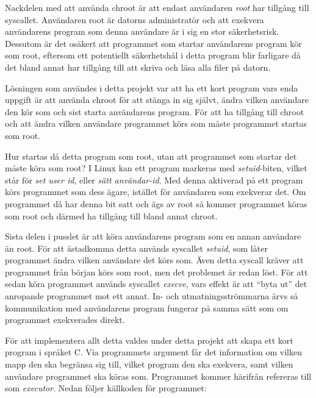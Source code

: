 \documentclass{article}
\begin{document}
Nackdelen med att använda chroot är att endast användaren \textit{root} har
tillgång till syscallet. Användaren root är datorns administratör och att
exekvera an\-vändarens program som denna användare är i sig en stor
säkerhetsrisk.  Dessutom är det osäkert att programmet som startar användarens
program kör som root, eftersom ett potentiellt säkerhetshål i detta program blir
farligare då det bland annat har tillgång till att skriva och läsa alla filer på
datorn.

Lösningen som användes i detta projekt var att ha ett kort program vars enda
uppgift är att använda chroot för att stänga in sig självt, ändra vilken
användare den kör som och sist starta användarens program. För att ha tillgång
till chroot och att ändra vilken användare programmet körs som måste programmet
startas som root.

Hur startas då detta program som root, utan att programmet som startar det måste
köra som root? I Linux kan ett program markeras med \textit{setuid}-biten,
vilket står för \textit{set user id}, eller \textit{sätt användar-id}. Med
denna aktiverad på ett program körs programmet som dess ägare, istället för
användaren som exekverar det. Om programmet då har denna bit satt och ägs av
root så kommer programmet köras som root och därmed ha tillgång till bland annat
chroot.

Sista delen i pusslet är att köra användarens program som en annan användare än
root. För att åstadkomma detta används syscallet \textit{setuid}, som låter
programmet ändra vilken användare det körs som. Även detta syscall kräver att
programmet från början körs som root, men det problemet är redan löst. För att
sedan köra programmet används syscallet \textit{execve}, vars effekt är att
``byta ut'' det anropande programmet mot ett annat. In- och utmatningsströmmarna
ärvs så kommunikation med användarens program fungerar på samma sätt som om
programmet exekverades direkt.

\hypertarget{executor}{}
\label{executor}

För att implementera allt detta valdes under detta projekt att skapa ett kort
program i språket C. Via programmets argument får det information om vilken mapp
den ska begränsa sig till, vilket program den ska exekvera, samt vilken
användare programmet ska köras som. Programmet kommer härifrån refereras till
som \textit{executor}. Nedan följer källkoden för programmet:
\end{document}
